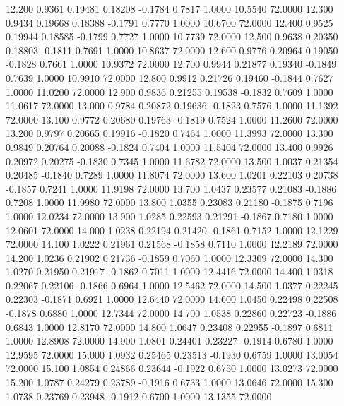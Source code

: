   12.200   0.9361   0.19481   0.18208  -0.1784   0.7817   1.0000  10.5540  72.0000
  12.300   0.9434   0.19668   0.18388  -0.1791   0.7770   1.0000  10.6700  72.0000
  12.400   0.9525   0.19944   0.18585  -0.1799   0.7727   1.0000  10.7739  72.0000
  12.500   0.9638   0.20350   0.18803  -0.1811   0.7691   1.0000  10.8637  72.0000
  12.600   0.9776   0.20964   0.19050  -0.1828   0.7661   1.0000  10.9372  72.0000
  12.700   0.9944   0.21877   0.19340  -0.1849   0.7639   1.0000  10.9910  72.0000
  12.800   0.9912   0.21726   0.19460  -0.1844   0.7627   1.0000  11.0200  72.0000
  12.900   0.9836   0.21255   0.19538  -0.1832   0.7609   1.0000  11.0617  72.0000
  13.000   0.9784   0.20872   0.19636  -0.1823   0.7576   1.0000  11.1392  72.0000
  13.100   0.9772   0.20680   0.19763  -0.1819   0.7524   1.0000  11.2600  72.0000
  13.200   0.9797   0.20665   0.19916  -0.1820   0.7464   1.0000  11.3993  72.0000
  13.300   0.9849   0.20764   0.20088  -0.1824   0.7404   1.0000  11.5404  72.0000
  13.400   0.9926   0.20972   0.20275  -0.1830   0.7345   1.0000  11.6782  72.0000
  13.500   1.0037   0.21354   0.20485  -0.1840   0.7289   1.0000  11.8074  72.0000
  13.600   1.0201   0.22103   0.20738  -0.1857   0.7241   1.0000  11.9198  72.0000
  13.700   1.0437   0.23577   0.21083  -0.1886   0.7208   1.0000  11.9980  72.0000
  13.800   1.0355   0.23083   0.21180  -0.1875   0.7196   1.0000  12.0234  72.0000
  13.900   1.0285   0.22593   0.21291  -0.1867   0.7180   1.0000  12.0601  72.0000
  14.000   1.0238   0.22194   0.21420  -0.1861   0.7152   1.0000  12.1229  72.0000
  14.100   1.0222   0.21961   0.21568  -0.1858   0.7110   1.0000  12.2189  72.0000
  14.200   1.0236   0.21902   0.21736  -0.1859   0.7060   1.0000  12.3309  72.0000
  14.300   1.0270   0.21950   0.21917  -0.1862   0.7011   1.0000  12.4416  72.0000
  14.400   1.0318   0.22067   0.22106  -0.1866   0.6964   1.0000  12.5462  72.0000
  14.500   1.0377   0.22245   0.22303  -0.1871   0.6921   1.0000  12.6440  72.0000
  14.600   1.0450   0.22498   0.22508  -0.1878   0.6880   1.0000  12.7344  72.0000
  14.700   1.0538   0.22860   0.22723  -0.1886   0.6843   1.0000  12.8170  72.0000
  14.800   1.0647   0.23408   0.22955  -0.1897   0.6811   1.0000  12.8908  72.0000
  14.900   1.0801   0.24401   0.23227  -0.1914   0.6780   1.0000  12.9595  72.0000
  15.000   1.0932   0.25465   0.23513  -0.1930   0.6759   1.0000  13.0054  72.0000
  15.100   1.0854   0.24866   0.23644  -0.1922   0.6750   1.0000  13.0273  72.0000
  15.200   1.0787   0.24279   0.23789  -0.1916   0.6733   1.0000  13.0646  72.0000
  15.300   1.0738   0.23769   0.23948  -0.1912   0.6700   1.0000  13.1355  72.0000
